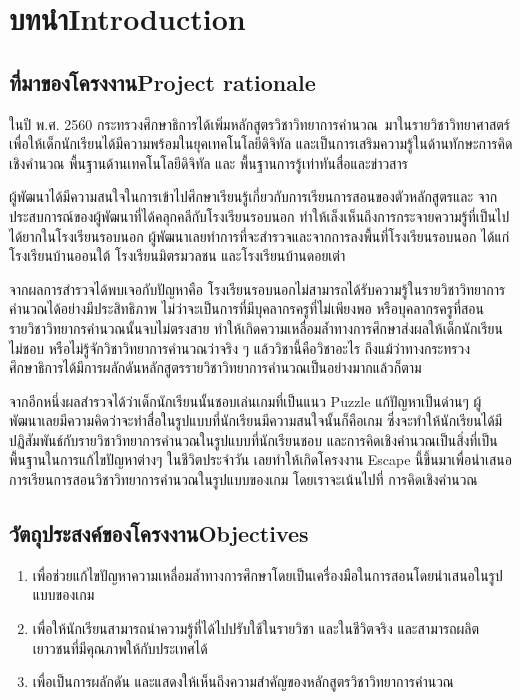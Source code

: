 \chapter{\ifcpe บทนำ\else Introduction\fi}

\section{\ifcpe ที่มาของโครงงาน\else Project rationale\fi}
ในปี พ.ศ. 2560 กระทรวงศึกษาธิการได้เพิ่มหลักสูตรวิชาวิทยาการคำนวณ~\cite{cpc}มาในรายวิชาวิทยาศาสตร์
 เพื่อให้เด็กนักเรียนได้มีความพร้อมในยุคเทคโนโลยีดิจิทัล 
และเป็นการเสริมความรู้ในด้านทักษะการคิดเชิงคำนวณ 
พื้นฐานด้านเทคโนโลยีดิจิทัล และ พื้นฐานการรู้เท่าทันสื่อและข่าวสาร\par

ผู้พัฒนาได้มีความสนใจในการเข้าไปศึกษาเรียนรู้เกี่ยวกับการเรียนการสอนของตัวหลักสูตรและ
จากประสบการณ์ของผู้พัฒนาที่ได้คลุกคลีกับโรงเรียนรอบนอก
ทำให้เล็งเห็นถึงการกระจายความรู้ที่เป็นไปได้ยากในโรงเรียนรอบนอก ผู้พัฒนาเลยทำการที่จะสำรวจและจากการลงพื้นที่โรงเรียนรอบนอก
 ได้แก่ โรงเรียนบ้านออนใต้ โรงเรียนมิตรมวลชน และโรงเรียนบ้านดอยเต่า\par

จากผลการสำรวจได้พบเจอกับปัญหาคือ โรงเรียนรอบนอกไม่สามารถได้รับความรู้ในรายวิชาวิทยาการคำนวณได้อย่างมีประสิทธิภาพ 
ไม่ว่าจะเป็นการที่มีบุคลากรครูที่ไม่เพียงพอ หรือบุคลากรครูที่สอนรายวิชาวิทยากรคำนวณนั้นจบไม่ตรงสาย 
ทำให้เกิดความเหลื่อมล้ำทางการศึกษาส่งผลให้เด็กนักเรียนไม่ชอบ หรือไม่รู้จักวิชาวิทยาการคำนวณว่าจริง ๆ 
แล้ววิชานี้คือวิชาอะไร ถึงแม้ว่าทางกระทรวงศึกษาธิการได้มีการผลักดันหลักสูตรรายวิชาวิทยาการคำนวณเป็นอย่างมากแล้วก็ตาม\par

จากอีกหนึ่งผลสำรวจได้ว่าเด็กนักเรียนนั้นชอบเล่นเกมที่เป็นแนว Puzzle แก้ปัญหาเป็นด่านๆ ผู้พัฒนาเลยมีความคิดว่าจะทำสื่อในรูปแบบที่นักเรียนมีความสนใจนั้นก็คือเกม
ซึ่งจะทำให้นักเรียนได้มีปฏิสัมพันธ์กับรายวิชาวิทยาการคำนวณในรูปแบบที่นักเรียนชอบ และการคิดเชิงคำนวณเป็นสิ่งที่เป็นพื้นฐานในการแก้ไขปัญหาต่างๆ ในชีวิตประจำวัน
เลยทำให้เกิดโครงงาน Escape นี้ขึ้นมาเพื่อนำเสนอการเรียนการสอนวิชาวิทยาการคำนวณในรูปแบบของเกม
โดยเราจะเน้นไปที่ การคิดเชิงคำนวณ

\section{\ifcpe วัตถุประสงค์ของโครงงาน\else Objectives\fi}
\begin{enumerate}
    \item เพื่อช่วยแก้ไขปัญหาความเหลื่อมล้ำทางการศึกษาโดยเป็นเครื่องมือในการสอนโดยนำเสนอในรูปแบบของเกม
    \item เพื่อให้นักเรียนสามารถนำความรู้ที่ได้ไปปรับใช้ในรายวิชา และในชีวิตจริง และสามารถผลิตเยาวชนที่มีคุณภาพให้กับประเทศได้
    \item เพื่อเป็นการผลักดัน และแสดงให้เห็นถึงความสำคัญของหลักสูตรวิชาวิทยาการคำนวณ
\end{enumerate}


